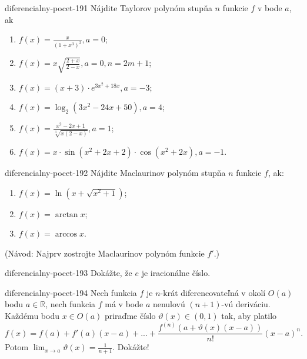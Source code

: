 \begin{defproblem}{diferencialny-pocet-191}
Nájdite Taylorov polynóm stupňa $n$ funkcie $f$ v bode $a$, ak
\begin{multicols}{2}
\begin{enumerate}
    \item $f(x)=\frac{x}{(1+x^3)^2},a=0$;
	\item $f(x)=x\sqrt{\frac{2+x}{2-x}},a=0,n=2m+1$;
	\item $f(x)=(x+3)\cdot e^{3x^2+18x},a=-3$;
	\item $f(x)=\log_2(3x^2-24x+50),a=4$;
	\item $f(x)=\frac{x^2-2x+1}{\sqrt[3]{x(2-x)}},a=1$;
	\item $f(x)=x\cdot\sin (x^2+2x+2)\cdot\cos (x^2+2x),a=-1$.
\end{enumerate}
\end{multicols}
\end{defproblem}

\begin{defproblem}{diferencialny-pocet-192}
Nájdite Maclaurinov polynóm stupňa $n$ funkcie $f$, ak:
\begin{multicols}{2}
\begin{enumerate}
	\item $f(x)=\ln (x+\sqrt{x^2+1})$;
	\item $f(x)=\arctan x$;
	\item $f(x)=\arccos x$.
\end{enumerate}
\end{multicols}
(Návod: Najprv zostrojte Maclaurinov polynóm funkcie $f'$.)
\end{defproblem}

\begin{defproblem}{diferencialny-pocet-193}
Dokážte, že $e$ je iracionálne číslo.
\end{defproblem}

\begin{defproblem}{diferencialny-pocet-194}
Nech funkcia $f$ je $n$-krát diferencovateľná v okolí $O(a)$ bodu $a\in\mathbb{R}$, nech funkcia $f$ má v bode $a$ nenulovú $(n+1)$-vú deriváciu. Každému bodu $x\in O(a)$ priraďme číslo $\vartheta (x)\in (0,1)$ tak, aby platilo 
$$f(x)=f(a)+f'(a)(x-a)+...+\frac{f^{(n)}(a+\vartheta (x)(x-a))}{n!}(x-a)^n.$$
Potom $\lim_{x\rightarrow a}\vartheta (x)=\frac{1}{n+1}$. Dokážte!
\end{defproblem}

